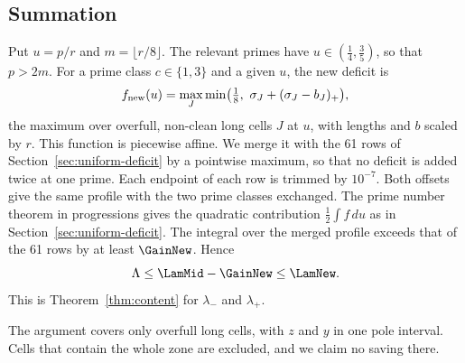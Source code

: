 \subsection{Summation}
Put $u=p/r$ and $m=\lfloor r/8\rfloor$. The relevant primes have $u\in(\frac14,\frac35)$, so that $p>2m$. For a prime class $c\in\{1,3\}$ and a given $u$, the new deficit is
\[
 f_{\rm new}(u)=\max_J\min\bigl(\tfrac18,\ \sigma_J+(\sigma_J-b_J)_+\bigr),
\]
the maximum over overfull, non-clean long cells $J$ at $u$, with lengths and $b$ scaled by $r$. This function is piecewise affine.
We merge it with the 61 rows of Section~\ref{sec:uniform-deficit} by a pointwise maximum, so that no deficit is added twice at one prime. Each endpoint of each row is trimmed by $10^{-7}$.
Both offsets give the same profile with the two prime classes exchanged. The prime number theorem in progressions gives the quadratic contribution $\frac12\int f\,du$ as in Section~\ref{sec:uniform-deficit}.
The integral over the merged profile exceeds that of the 61 rows by at least $\GainNew$. Hence
\[
 \Lambda\le\LamMid-\GainNew\le\LamNew .
\]
This is Theorem~\ref{thm:content} for $\lambda_-$ and $\lambda_+$.

\begin{remark}
The argument covers only overfull long cells, with $z$ and $y$ in one pole interval. Cells that contain the whole zone are excluded, and we claim no saving there.
\end{remark}
